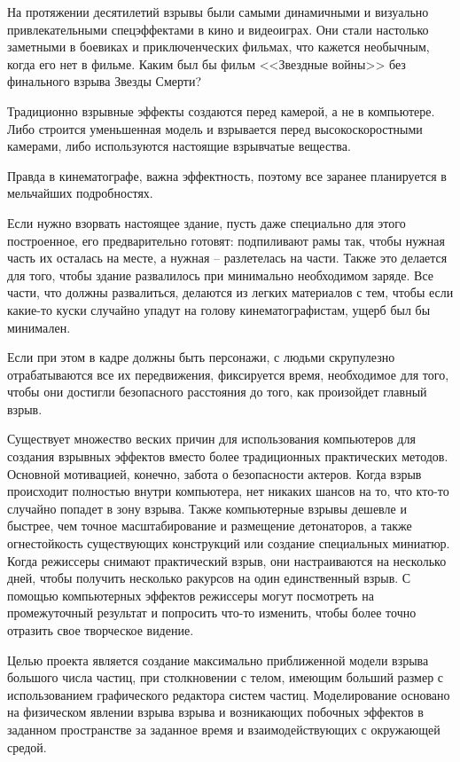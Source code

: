 \Introduction

\hfill

	На протяжении десятилетий взрывы были самыми динамичными и визуально привлекательными спецэффектами в кино и видеоиграх. Они стали настолько заметными в боевиках и приключенческих фильмах, что кажется необычным, когда его нет в фильме. Каким был бы фильм <<Звездные войны>> без финального взрыва Звезды Смерти? 
	
	Традиционно взрывные эффекты создаются перед камерой, а не в компьютере. Либо строится уменьшенная модель и взрывается перед высокоскоростными камерами, либо используются настоящие взрывчатые вещества. 
	
	Правда в кинематографе, важна эффектность, поэтому все заранее планируется в мельчайших подробностях.
	
	Если нужно взорвать настоящее здание, пусть даже специально для этого построенное, его предварительно готовят: подпиливают рамы так, чтобы нужная часть их осталась на месте, а нужная – разлетелась на части. Также это делается для того, чтобы здание развалилось при минимально необходимом заряде. Все части, что должны развалиться, делаются из легких материалов с тем, чтобы если какие-то куски случайно упадут на голову кинематографистам, ущерб был бы минимален. 
	
	Если при этом в кадре должны быть персонажи, с людьми скрупулезно отрабатываются все их передвижения, фиксируется время, необходимое для того, чтобы они достигли безопасного расстояния до того, как произойдет главный взрыв. \cite{cinemaexplosion}
	
	Существует множество веских причин для использования компьютеров для создания взрывных эффектов вместо более традиционных практических методов. Основной мотивацией, конечно, забота о безопасности актеров. Когда взрыв происходит полностью внутри компьютера, нет никаких шансов на то, что кто-то случайно попадет в зону взрыва. Также компьютерные взрывы дешевле и быстрее, чем точное масштабирование и размещение детонаторов, а также огнестойкость существующих конструкций или создание специальных миниатюр. Когда режиссеры снимают практический взрыв, они настраиваются на несколько дней, чтобы получить несколько ракурсов на один единственный взрыв. С помощью компьютерных эффектов режиссеры могут посмотреть на промежуточный результат и попросить что-то изменить, чтобы более точно отразить свое творческое видение. 
	
	Целью проекта является создание максимально приближенной модели взрыва большого числа частиц, при столкновении с телом, имеющим больший размер с использованием графического редактора систем частиц. Моделирование основано на физическом явлении взрыва взрыва и возникающих побочных эффектов в заданном пространстве за заданное время и взаимодействующих с окружающей средой. 
	
